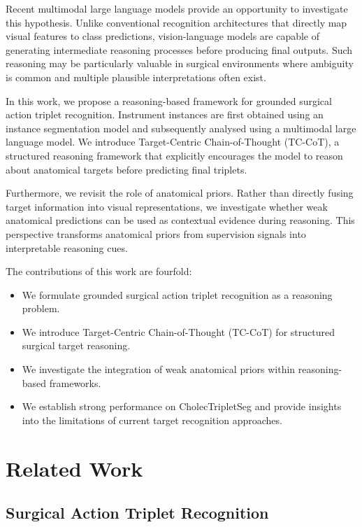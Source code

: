 \documentclass[11pt]{article}
\begin{document}
Recent multimodal large language models provide an opportunity to investigate this hypothesis. Unlike conventional recognition architectures that directly map visual features to class predictions, vision-language models are capable of generating intermediate reasoning processes before producing final outputs. Such reasoning may be particularly valuable in surgical environments where ambiguity is common and multiple plausible interpretations often exist.

In this work, we propose a reasoning-based framework for grounded surgical action triplet recognition. Instrument instances are first obtained using an instance segmentation model and subsequently analysed using a multimodal large language model. We introduce Target-Centric Chain-of-Thought (TC-CoT), a structured reasoning framework that explicitly encourages the model to reason about anatomical targets before predicting final triplets.

Furthermore, we revisit the role of anatomical priors. Rather than directly fusing target information into visual representations, we investigate whether weak anatomical predictions can be used as contextual evidence during reasoning. This perspective transforms anatomical priors from supervision signals into interpretable reasoning cues.

The contributions of this work are fourfold:

\begin{itemize}
\item We formulate grounded surgical action triplet recognition as a reasoning problem.
\item We introduce Target-Centric Chain-of-Thought (TC-CoT) for structured surgical target reasoning.
\item We investigate the integration of weak anatomical priors within reasoning-based frameworks.
\item We establish strong performance on CholecTripletSeg and provide insights into the limitations of current target recognition approaches.
\end{itemize}

\section{Related Work}

\subsection{Surgical Action Triplet Recognition}
\end{document}
